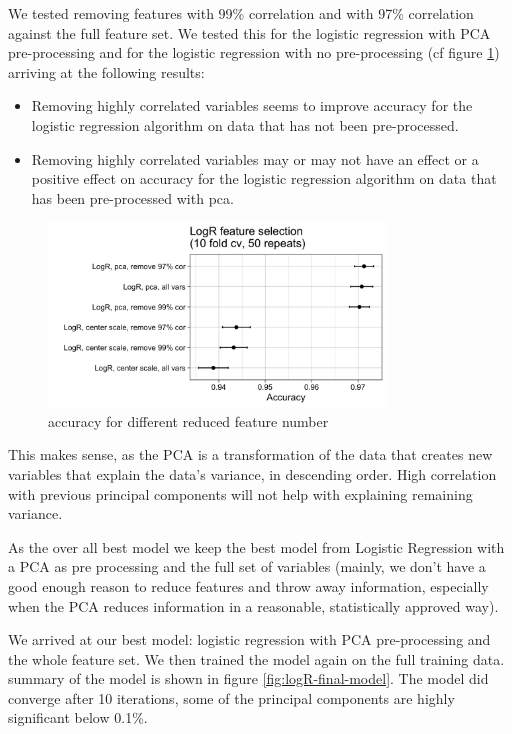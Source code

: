 \documentclass[]{article}
\providecommand{\tightlist}{%
  \setlength{\itemsep}{0pt}\setlength{\parskip}{0pt}}
\begin{document}
We tested removing features with 99\% correlation and with 97\%
correlation against the full feature set. We tested this for the
logistic regression with PCA pre-processing and for the logistic
regression with no pre-processing (cf figure
\ref{fig:feature-reduction-options}) arriving at the following results:

\begin{itemize}
\tightlist
\item
  Removing highly correlated variables seems to improve accuracy for the
  logistic regression algorithm on data that has not been pre-processed.
\item
  Removing highly correlated variables may or may not have an effect or
  a positive effect on accuracy for the logistic regression algorithm on
  data that has been pre-processed with pca.
\end{itemize}

\begin{figure}
    \centering
    \includegraphics[width=0.8\textwidth]{images/feature-selection.png}
    \caption{accuracy for different reduced feature number}
    \label{fig:feature-reduction-options}
\end{figure}

This makes sense, as the PCA is a transformation of the data that
creates new variables that explain the data's variance, in descending
order. High correlation with previous principal components will not help
with explaining remaining variance.

As the over all best model we keep the best model from Logistic
Regression with a PCA as pre processing and the full set of variables
(mainly, we don't have a good enough reason to reduce features and throw
away information, especially when the PCA reduces information in a
reasonable, statistically approved way).

We arrived at our best model: logistic regression with PCA
pre-processing and the whole feature set. We then trained the model
again on the full training data. summary of the model is shown in figure
\ref{fig:logR-final-model}. The model did converge after 10 iterations,
some of the principal components are highly significant below 0.1\%.
\end{document}
